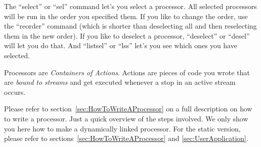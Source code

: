 \documentclass[12pt]{article}
\begin{document}
The ``select'' or ``sel'' command let's you select a processor. All
selected processors will be run in the order you specified them. If you
like to change the order, use the ``reorder'' command (which is shorter
than deselecting all and then reselecting them in the new order).  If
you like to deselect a processor, ``deselect'' or ``desel'' will let you
do that. And ``listsel'' or ``lss'' let's you see which ones you have
selected. 

Processors are \emph{Containers of Actions}. Actions are pieces of code
you wrote that are \emph{bound to streams} and get executed whenever a
stop in an active stream occurs.

Please refer to section~\ref{sec:HowToWriteAProcessor} on a full
description on how to write a processor. Just a quick overview of the
steps involved. We only show you here how to make a dynamically linked
processor. For the static version, please refer to
sections~\ref{sec:HowToWriteAProcessor} and \ref{sec:UserApplication}.
%
\end{document}
